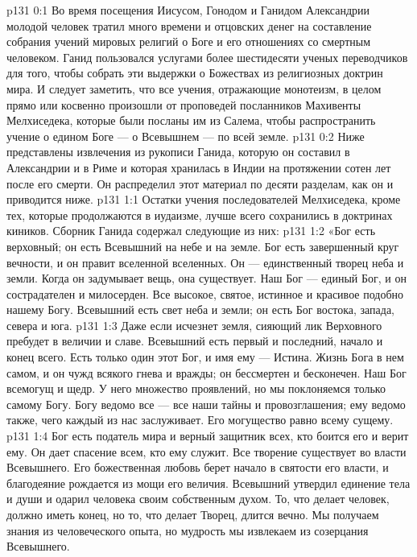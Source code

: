 \author{Комиссия срединников}
\vs p131 0:1 Во время посещения Иисусом, Гонодом и Ганидом Александрии молодой человек тратил много времени и отцовских денег на составление собрания учений мировых религий о Боге и его отношениях со смертным человеком. Ганид пользовался услугами более шестидесяти ученых переводчиков для того, чтобы собрать эти выдержки о Божествах из религиозных доктрин мира. И следует заметить, что все учения, отражающие монотеизм, в целом прямо или косвенно произошли от проповедей посланников Махивенты Мелхиседека, которые были посланы им из Салема, чтобы распространить учение о едином Боге --- о Всевышнем --- по всей земле.
\vs p131 0:2 Ниже представлены извлечения из рукописи Ганида, которую он составил в Александрии и в Риме и которая хранилась в Индии на протяжении сотен лет после его смерти. Он распределил этот материал по десяти разделам, как он и приводится ниже.
\vs p131 1:1 Остатки учения последователей Мелхиседека, кроме тех, которые продолжаются в иудаизме, лучше всего сохранились в доктринах киников. Сборник Ганида содержал следующие из них:
\vs p131 1:2 \pc «Бог есть верховный; он есть Всевышний на небе и на земле. Бог есть завершенный круг вечности, и он правит вселенной вселенных. Он --- единственный творец неба и земли. Когда он задумывает вещь, она существует. Наш Бог --- единый Бог, и он сострадателен и милосерден. Все высокое, святое, истинное и красивое подобно нашему Богу. Всевышний есть свет неба и земли; он есть Бог востока, запада, севера и юга.
\vs p131 1:3 Даже если исчезнет земля, сияющий лик Верховного пребудет в величии и славе. Всевышний есть первый и последний, начало и конец всего. Есть только один этот Бог, и имя ему --- Истина. Жизнь Бога в нем самом, и он чужд всякого гнева и вражды; он бессмертен и бесконечен. Наш Бог всемогущ и щедр. У него множество проявлений, но мы поклоняемся только самому Богу. Богу ведомо все --- все наши тайны и провозглашения; ему ведомо также, чего каждый из нас заслуживает. Его могущество равно всему сущему.
\vs p131 1:4 Бог есть податель мира и верный защитник всех, кто боится его и верит ему. Он дает спасение всем, кто ему служит. Все творение существует во власти Всевышнего. Его божественная любовь берет начало в святости его власти, и благодеяние рождается из мощи его величия. Всевышний утвердил единение тела и души и одарил человека своим собственным духом. То, что делает человек, должно иметь конец, но то, что делает Творец, длится вечно. Мы получаем знания из человеческого опыта, но мудрость мы извлекаем из созерцания Всевышнего.

